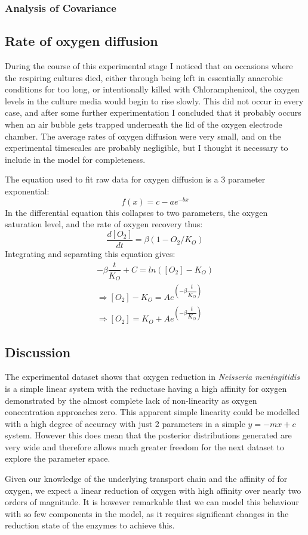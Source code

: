 \subsubsection{Analysis of Covariance}

\subsection{Rate of oxygen diffusion}
During the course of this experimental stage I noticed that on occasions where the respiring cultures died, either through being left in essentially anaerobic conditions for too long, or intentionally killed with Chloramphenicol, the oxygen levels in the culture media would begin to rise slowly. This did not occur in every case, and after some further experimentation I concluded that it probably occurs when an air bubble gets trapped underneath the lid of the oxygen electrode chamber. The average rates of oxygen diffusion were very small, and on the experimental timescales are probably negligible, but I thought it necessary to include in the model for completeness.

The equation used to fit raw data for oxygen diffusion is a 3 parameter exponential:
\begin{equation*}
f(x) = c - ae^{-bx} 
\end{equation*}
In the differential equation this collapses to two parameters, the oxygen saturation level, and the rate of oxygen recovery thus:
\begin{equation*}
\dfrac{d[O_2]}{dt} = \beta(1-O_2/K_O)
\end{equation*}
Integrating and separating this equation gives:
\begin{equation*}
\begin{gathered}
-\beta\dfrac{t}{K_O} + C = ln([O_2]-K_O)\\
\Rightarrow [O_2]-K_O = Ae^{\left(-\beta\dfrac{t}{K_O}\right)}\\
\Rightarrow [O_2] = K_O + Ae^{\left(-\beta\dfrac{t}{K_O}\right)}
\end{gathered}
\end{equation*}

\subsection{Discussion}
The experimental dataset shows that oxygen reduction in \textit{Neisseria meningitidis} is a simple linear system with the reductase having a high affinity for oxygen demonstrated by the almost complete lack of non-linearity as oxygen concentration approaches zero. This apparent simple linearity could be modelled with a high degree of accuracy with just 2 parameters in a simple $y=-mx+c$ system. However this does mean that the posterior distributions generated are very wide and therefore allows much greater freedom for the next dataset to explore the parameter space.

Given our knowledge of the underlying transport chain and the affinity of \cbbthree{} for oxygen, we expect a linear reduction of oxygen with high affinity over nearly two orders of magnitude. It is however remarkable that we can model this behaviour with so few components in the model, as it requires significant changes in the reduction state of the enzymes to achieve this.